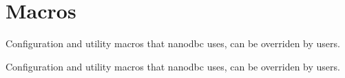 \hypertarget{group__macros}{}\section{Macros}
\label{group__macros}


Configuration and utility macros that nanodbc uses, can be overriden by users.  


Configuration and utility macros that nanodbc uses, can be overriden by users. 

